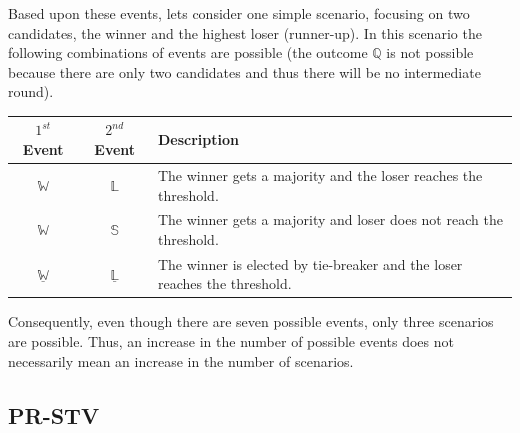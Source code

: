 \documentclass[runningheads,a4paper]{llncs}
\newcommand{\winner}{\ensuremath{\mathbb{W}}}
\newcommand{\loser}{\ensuremath{\mathbb{L}}}
\newcommand{\quota}{\ensuremath{\mathbb{Q}}}
\newcommand{\belowthreshold}{\ensuremath{\mathbb{S}}}
\newcommand{\tiebreak}[1]{\ensuremath{\underline{#1}}}
\newcommand{\first}{$1^{st}$\xspace}
\newcommand{\second}{$2^{nd}$\xspace}
\begin{document}
Based upon these events, lets consider one simple scenario, focusing
on two candidates, the winner and the highest loser (runner-up).  In
this scenario the following combinations of events are possible (the
outcome $\quota$ is not possible because there are only two candidates
and thus there will be no intermediate round).
\begin{center}
  \begin{longtable}{c|c|p{}}
    \first Event & \second Event & Description \\ 
    \hline
    \winner & \loser  & The winner gets a majority and the loser
    reaches the threshold. \\
    \winner & \belowthreshold & The winner gets a majority and loser does
    not reach the threshold. \\
    \tiebreak{\winner} & \tiebreak{\loser} & The winner is elected
    by tie-breaker and the loser reaches the threshold. \\
  \end{longtable}
\end{center}

Consequently, even though there are seven possible events, only three
scenarios are possible.  Thus, an increase in the number of possible
events does not necessarily mean an increase in the number of
scenarios.

\subsection{PR-STV}
\end{document}
